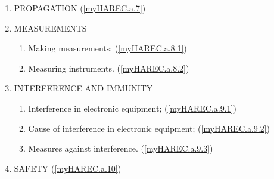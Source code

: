 \begin{enumerate}
\begin{enumerate}[noitemsep]
\end{enumerate}
\item PROPAGATION (\ref{myHAREC.a.7})\label{HAREC.a.7}
\item MEASUREMENTS
\begin{enumerate}[noitemsep]
\item Making measurements; (\ref{myHAREC.a.8.1})\label{HAREC.a.8.1}
\item Measuring instruments. (\ref{myHAREC.a.8.2})\label{HAREC.a.8.2}
\end{enumerate}
\item INTERFERENCE AND IMMUNITY
\begin{enumerate}[noitemsep]
\item Interference in electronic equipment; (\ref{myHAREC.a.9.1})\label{HAREC.a.9.1}
\item Cause of interference in electronic equipment; (\ref{myHAREC.a.9.2})\label{HAREC.a.9.2}
\item Measures against interference. (\ref{myHAREC.a.9.3})\label{HAREC.a.9.3}
\end{enumerate}
\item SAFETY (\ref{myHAREC.a.10})\label{HAREC.a.10}
\end{enumerate}
